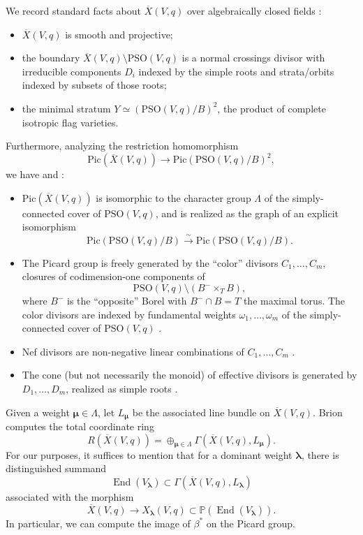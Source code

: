 \documentclass[12pt]{amsart}
\numberwithin{equation}{section}
\newcommand{\ra}{\rightarrow}
\newcommand{\blambda}{\boldsymbol{\lambda}}
\newcommand{\bmu}{\boldsymbol{\mu}}
\newcommand{\bP}{\mathbb{P}}
\newcommand{\oX}{\overline{X}}
\newcommand{\End}{\operatorname{End}}
\newcommand{\Pic}{\mathrm{Pic}}
\newcommand{\PSO}{\mathrm{PSO}}
\theoremstyle{plain}
\theoremstyle{definition}
\theoremstyle{remark}
\begin{document}
We record standard facts about $\oX(V,q)$ over
algebraically closed fields \cite[3.1]{DP}:
\begin{itemize}
\item{$\oX(V,q)$ is smooth and projective;}
\item{the boundary $\oX(V,q) \setminus \PSO(V,q)$ is 
a normal crossings divisor with irreducible components $D_i$ indexed by the simple roots and strata/orbits indexed by subsets of those roots;}
\item{the minimal stratum $Y \simeq (\PSO(V,q)/B)^2$, 
the product of complete isotropic flag varieties.}
\end{itemize}
Furthermore, analyzing the restriction homomorphism
$$\Pic(\oX(V,q)) \ra \Pic(\PSO(V,q)/B)^2,$$
we have \cite[{\S}8]{DP} and \cite[2.1.3]{BrionTotal}:
\begin{itemize}
\item{$\Pic(\oX(V,q))$ is isomorphic to the character group $\Lambda$ of the simply-connected cover of $\PSO(V,q)$, and is realized as the graph of an explicit isomorphism $$\Pic(\PSO(V,q)/B)\stackrel{\sim}{\ra}\Pic(\PSO(V,q)/B).$$}
\item{The Picard group is freely generated by the ``color'' divisors
$C_1,\ldots,C_m$, closures of codimension-one components of $$\PSO(V,q) \setminus (B^-\times_T B),$$ 
where $B^-$ is the ``opposite'' Borel with $B^-\cap B=T$ the maximal torus. The color divisors are indexed by fundamental
weights $\omega_1,\ldots,\omega_m$ of the simply-connected cover of $\PSO(V,q)$ \cite[2.2.4]{BrionTotal}.}
\item{Nef divisors are non-negative linear
combinations of $C_1,\ldots,C_m$ \cite[2.6]{Brion}.}
\item{The cone (but not necessarily the monoid) of effective divisors is generated by
$D_1,\ldots,D_m$, realized as simple roots
\cite[2.3.5]{BrionTotal}.}
\end{itemize}

Given a weight $\bmu\in \Lambda$, let $L_{\bmu}$ be the associated line bundle on $\oX(V,q)$. 
Brion \cite[3.2.4]{BrionTotal} computes the total coordinate ring 
$$
R(\oX(V,q))=\oplus_{\bmu\in \Lambda} \Gamma(\oX(V,q),L_{\bmu}).
$$
For our purposes, it suffices to mention that for a dominant weight $\blambda$, there is distinguished summand
$$\End(V_{\blambda}) \subset \Gamma(\oX(V,q),L_{\blambda})$$
associated with the morphism 
$$\oX(V,q) \ra X_{\blambda}(V,q) \subset \bP(\End(V_{\blambda})).$$
In particular, we can compute the image of $\beta^*$
on the Picard group.
\end{document}
